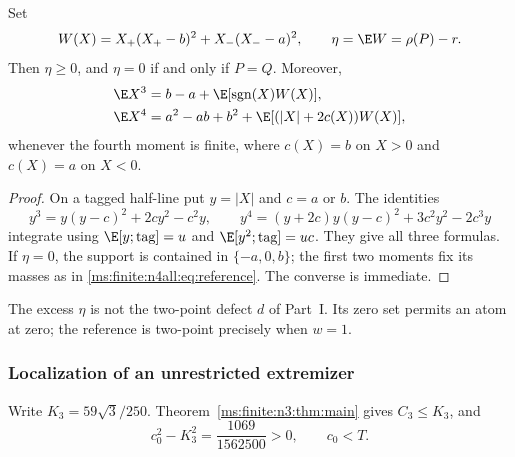 \begin{lemma}\label{ms:finite:n4all:lem:excess}
Set
\[
 W(X)=X_+(X_+-b)^2+X_-(X_--a)^2,\qquad
 \eta=\E W=\rho(P)-r.
\]
Then $\eta\ge0$, and $\eta=0$ if and only if $P=Q$.
Moreover,
\begin{align}
 \E X^3&=b-a+\E[\operatorname{sgn}(X)W(X)],\notag\\
 \E X^4&=a^2-ab+b^2+
   \E[(|X|+2c(X))W(X)],\label{ms:finite:n4all:eq:physical-moments}
\end{align}
whenever the fourth moment is finite, where $c(X)=b$ on $X>0$ and
$c(X)=a$ on $X<0$.
\end{lemma}
\begin{proof}
On a tagged half-line put $y=|X|$ and $c=a$ or $b$. The identities
\[
 y^3=y(y-c)^2+2cy^2-c^2y,
 \qquad
 y^4=(y+2c)y(y-c)^2+3c^2y^2-2c^3y
\]
integrate using $\E[y;\text{tag}]=u$ and
$\E[y^2;\text{tag}]=uc$. They give all three formulas.
If $\eta=0$, the support is contained in $\{-a,0,b\}$; the first
two moments fix its masses as in \eqref{ms:finite:n4all:eq:reference}.
The converse is immediate.
\end{proof}

The excess $\eta$ is not the two-point defect $d$ of Part~I.
Its zero set permits an atom at zero; the reference is two-point
precisely when $w=1$.

\subsubsection{Localization of an unrestricted extremizer}
Write $K_3=59\sqrt3/250$. Theorem~\ref{ms:finite:n3:thm:main} gives
$C_3\le K_3$, and
\[
 c_0^2-K_3^2=\frac{1069}{1562500}>0,\qquad c_0<T.
\]

